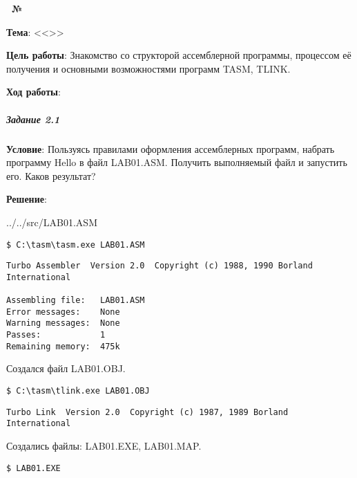 \begin{center}
   \textbf{\titlePageWorkType~№\titlePageWorkNumber~\titlePageWorkPart}
\end{center}

\textbf{Тема}: <<\titlePageTopic>>

\textbf{Цель работы}: Знакомство со структорой ассемблерной программы, процессом её получения и основными возможностями программ TASM, TLINK.

\begin{center}
   \textbf{Ход работы}:
\end{center}



\subparagraph{Задание 2.1} 

\textbf{Условие}: Пользуясь правилами оформления ассемблерных программ, набрать программу Hello в файл LAB01.ASM. Получить выполняемый файл и запустить его. Каков результат?

\textbf{Решение}: 


{../../src/LAB01.ASM}

\newpage



\begin{lstlisting}[language=Terminal]
$ C:\tasm\tasm.exe LAB01.ASM
\end{lstlisting}

\begin{lstlisting}[language=Out]
Turbo Assembler  Version 2.0  Copyright (c) 1988, 1990 Borland International

Assembling file:   LAB01.ASM
Error messages:    None
Warning messages:  None
Passes:            1
Remaining memory:  475k
\end{lstlisting}

Создался файл LAB01.OBJ.



\begin{lstlisting}[language=Terminal]
$ C:\tasm\tlink.exe LAB01.OBJ
\end{lstlisting}

\begin{lstlisting}[language=Out]
Turbo Link  Version 2.0  Copyright (c) 1987, 1989 Borland International
\end{lstlisting}

Создались файлы: LAB01.EXE, LAB01.MAP.



\begin{lstlisting}[language=Terminal]
$ LAB01.EXE
\end{lstlisting}

